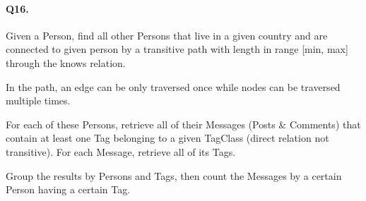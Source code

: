 \paragraph{Q16.}

Given a Person, find all other Persons that live in a given country and
are connected to given person by a transitive path with length in range
{[}min, max{]} through the knows relation.

In the path, an edge can be only traversed once while nodes can be
traversed multiple times.

For each of these Persons, retrieve all of their Messages (Posts \&
Comments) that contain at least one Tag belonging to a given TagClass
(direct relation not transitive). For each Message, retrieve all of its
Tags.

Group the results by Persons and Tags, then count the Messages by a
certain Person having a certain Tag.
